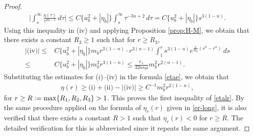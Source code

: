 \documentclass[a4paper,12pt,draft]{article}
\theoremstyle{remark}
\begin{document}
\begin{proof}
    \begin{align*}
        \bigg|\int_{s}^{\infty} \!\! \frac{\eta(\tau)}{\tau^{2n-1}}\, d\tau \bigg| \le C \big\{ u_b^2 + |\eta_b| \big\} \int_{s}^{\infty} \!\! \tau^{-3n+2} \, d \tau = C \big\{ u_b^2 + |\eta_b| \big\}  s^{3(1-n)}.
    \end{align*}
    Using this inequality in \textrm{(iv)} and applying Proposition \ref{prop:H-M}, we obtain that there exists a constant $R_3\ge 1$ such that for $r\ge R_3$,
    \begin{align*}
        |\textrm{(iv)}| \le& C \big\{ u_b^2 + |\eta_b| \big\} m_b r^{3(1-n)} \cdot r^{3(n-1)} \int_{1}^{r}\!\! s^{3(1-n)}e^{\frac{\kappa}{m_b}(s^n-r^n)}\, ds\\
        \le & C \big\{ u_b^2 + |\eta_b| \big\} m_b^2 r^{3(1-n)} \le \frac{v_{+}}{32 n \kappa \mu} m_b^2 r^{2(n-1)}.
    \end{align*}
    Substituting the estimates for \textrm{(i)}--\textrm{(iv)} in the formula \eqref{etae}, we obtain that
    \begin{align*}
        \eta(r) \ge \textrm{(i)} + \textrm{(ii)} - |\textrm{(iv)}| %
        \ge  C^{-1} m_b^2 r^{2(1-n)},
    \end{align*}
    for $r\ge R \vcentcolon= \max\{R_1,R_2,R_3\}> 1$. This proves the first inequality of \eqref{etalr}. By the same procedure applied on the formula of $\eta_r(r)$ given in \eqref{er-long}, it is also verified that there exists a constant $R>1$ such that $\eta_r(r) <0$ for $r\ge R$. The detailed verification for this is abbreviated since it repeats the same argument.
\end{proof}
\end{document}
